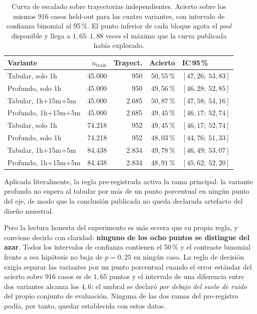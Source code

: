 \begin{table}[htbp]
\centering
\caption[Escalado sobre trayectorias independientes]{Curva de escalado sobre trayectorias
independientes. Acierto sobre los mismos 916 casos held-out para las cuatro variantes, con
intervalo de confianza binomial al 95\,\%. El punto inferior de cada bloque agota el
\emph{pool} disponible y llega a $1{,}65$--$1{,}88$ veces el máximo que la curva publicada
había explorado.}
\label{tab::escalado_trayectorias}
\begin{tabular}{lrrrl}
\hline
\textbf{Variante} & \textbf{$n_{\text{train}}$} & \textbf{Trayect.} & \textbf{Acierto} & \textbf{IC\,95\,\%} \\
\hline
Tabular, solo 1h & 45.000 & 950 & $50{,}55$\,\% & $[47{,}26;\ 53{,}83]$ \\
Profundo, solo 1h & 45.000 & 950 & $49{,}56$\,\% & $[46{,}28;\ 52{,}85]$ \\
Tabular, 1h+15m+5m & 45.000 & 2.685 & $50{,}87$\,\% & $[47{,}58;\ 54{,}16]$ \\
Profundo, 1h+15m+5m & 45.000 & 2.685 & $49{,}45$\,\% & $[46{,}17;\ 52{,}74]$ \\
\hline
Tabular, solo 1h & 74.218 & 952 & $49{,}45$\,\% & $[46{,}17;\ 52{,}74]$ \\
Profundo, solo 1h & 74.218 & 952 & $48{,}03$\,\% & $[44{,}76;\ 51{,}33]$ \\
Tabular, 1h+15m+5m & 84.438 & 2.834 & $49{,}78$\,\% & $[46{,}49;\ 53{,}07]$ \\
Profundo, 1h+15m+5m & 84.438 & 2.834 & $48{,}91$\,\% & $[45{,}62;\ 52{,}20]$ \\
\hline
\end{tabular}
\end{table}

Aplicada literalmente, la regla pre-registrada activa la rama principal: la variante profunda
no supera al tabular por más de un punto porcentual en ningún punto del eje, de modo que
la conclusión publicada no queda declarada artefacto del diseño muestral.

Pero la lectura honesta del experimento es más severa que su propia regla, y conviene
decirlo con claridad: \textbf{ninguno de los ocho puntos se distingue del azar}. Todos los
intervalos de confianza contienen el 50\,\% y el contraste binomial frente a esa hipótesis
no baja de $p = 0{,}25$ en ningún caso. La regla de decisión exigía separar las variantes por
un punto porcentual cuando el error estándar del acierto sobre 916 casos es de $1{,}65$
puntos y el intervalo de una diferencia entre dos variantes alcanza los $4{,}6$: el umbral se
declaró \emph{por debajo del suelo de ruido} del propio conjunto de evaluación. Ninguna de
las dos ramas del pre-registro podía, por tanto, quedar establecida con estos datos.

